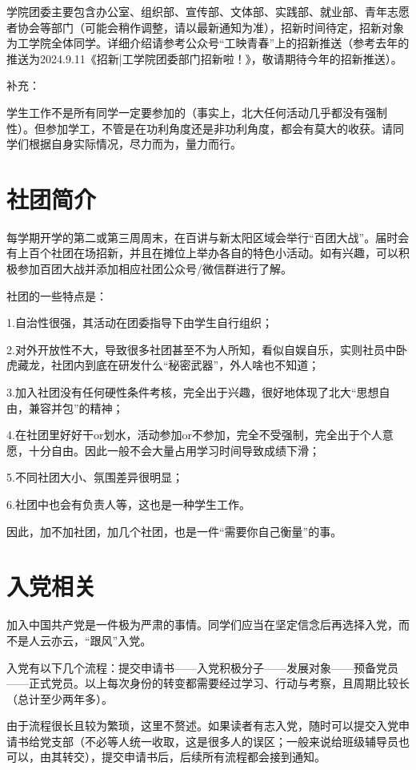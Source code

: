 \documentclass[11pt,oneside]{book}
\begin{document}
学院团委主要包含办公室、组织部、宣传部、文体部、实践部、就业部、青年志愿者协会等部门（可能会稍作调整，请以最新通知为准），招新时间待定，招新对象为工学院全体同学。详细介绍请参考公众号“工映青春”上的招新推送（参考去年的推送为2024.9.11《招新|工学院团委部门招新啦！》，敬请期待今年的招新推送）。

补充：

学生工作不是所有同学一定要参加的（事实上，北大任何活动几乎都没有强制性）。但参加学工，不管是在功利角度还是非功利角度，都会有莫大的收获。请同学们根据自身实际情况，尽力而为，量力而行。

\newpage

\section{社团简介}
每学期开学的第二或第三周周末，在百讲与新太阳区域会举行“百团大战”。届时会有上百个社团在场招新，并且在摊位上举办各自的特色小活动。如有兴趣，可以积极参加百团大战并添加相应社团公众号/微信群进行了解。

社团的一些特点是：

1.自治性很强，其活动在团委指导下由学生自行组织；

2.对外开放性不大，导致很多社团甚至不为人所知，看似自娱自乐，实则社员中卧虎藏龙，社团内到底在研发什么“秘密武器”，外人啥也不知道；

3.加入社团没有任何硬性条件考核，完全出于兴趣，很好地体现了北大“思想自由，兼容并包”的精神；

4.在社团里好好干or划水，活动参加or不参加，完全不受强制，完全出于个人意愿，十分自由。因此一般不会大量占用学习时间导致成绩下滑；

5.不同社团大小、氛围差异很明显；

6.社团中也会有负责人等，这也是一种学生工作。 

因此，加不加社团，加几个社团，也是一件“需要你自己衡量”的事。

\section{入党相关}
加入中国共产党是一件极为严肃的事情。同学们应当在坚定信念后再选择入党，而不是人云亦云，“跟风”入党。

入党有以下几个流程：提交申请书——入党积极分子——发展对象——预备党员——正式党员。以上每次身份的转变都需要经过学习、行动与考察，且周期比较长（总计至少两年多）。

由于流程很长且较为繁琐，这里不赘述。如果读者有志入党，随时可以提交入党申请书给党支部（不必等人统一收取，这是很多人的误区；一般来说给班级辅导员也可以，由其转交），提交申请书后，后续所有流程都会接到通知。
\end{document}
